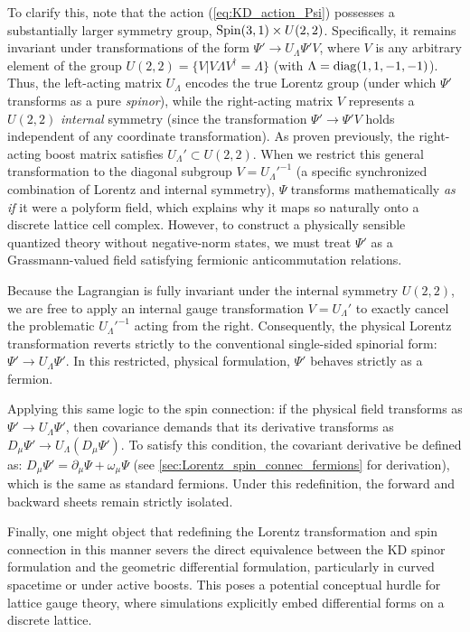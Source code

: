 To clarify this, note that the action (\ref{eq:KD_action_Psi}) possesses a substantially larger symmetry group, ${\rm Spin}(3,1)\times U(2,2)$. Specifically, it remains invariant under transformations of the form $\Psi'\to U_{\Lambda}\Psi' V$, where $V$ is any arbitrary element of the group $U(2,2)=\{V| V\Lambda V^{\dagger}=\Lambda\}$ (with $\Lambda={\rm diag}(1,1,-1,-1)$). Thus, the left-acting matrix $U_{\Lambda}$ encodes the true Lorentz group (under which $\Psi'$ transforms as a pure {\it spinor}), while the right-acting matrix $V$ represents a $U(2,2)$ {\it internal} symmetry (since the transformation $\Psi'\to \Psi' V$ holds independent of any coordinate transformation). As proven previously, the right-acting boost matrix satisfies $U_{\Lambda}'\subset U(2,2)$. When we restrict this general transformation to the diagonal subgroup $V=U_{\Lambda}'^{-1}$ (a specific synchronized combination of Lorentz and internal symmetry), $\Psi$ transforms mathematically {\it as if} it were a polyform field, which explains why it maps so naturally onto a discrete lattice cell complex. However, to construct a physically sensible quantized theory without negative-norm states, we must treat $\Psi'$ as a Grassmann-valued field satisfying fermionic anticommutation relations. 

Because the Lagrangian is fully invariant under the internal symmetry $U(2,2)$, we are free to apply an internal gauge transformation $V = U_\Lambda'$ to exactly cancel the problematic $U_\Lambda'^{-1}$ acting from the right. Consequently, the physical Lorentz transformation reverts strictly to the conventional single-sided spinorial form: $\Psi' \to U_\Lambda \Psi'$. In this restricted, physical formulation, $\Psi'$ behaves strictly as a fermion. 

Applying this same logic to the spin connection: if the physical field transforms as $\Psi' \to U_\Lambda \Psi'$, then covariance demands that its derivative transforms as $D_\mu\Psi' \to U_\Lambda (D_\mu\Psi')$. To satisfy this condition, the covariant derivative be defined as: $D_\mu\Psi'=\partial_\mu\Psi+\omega_\mu\Psi$ (see \cref{sec:Lorentz_spin_connec_fermions} for derivation), which is the same as standard fermions. Under this redefinition, the forward and backward sheets remain strictly isolated.

Finally, one might object that redefining the Lorentz transformation and spin connection in this manner severs the direct equivalence between the KD spinor formulation and the geometric differential formulation, particularly in curved spacetime or under active boosts. This poses a potential conceptual hurdle for lattice gauge theory, where simulations explicitly embed differential forms on a discrete lattice. 

